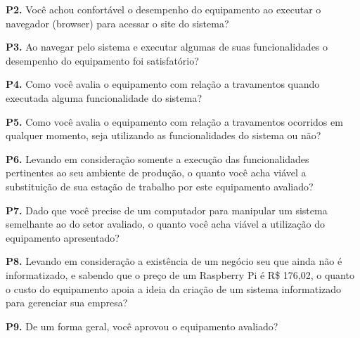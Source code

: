 \textbf{P2.} Você achou confortável o desempenho do equipamento ao executar o navegador (browser) para acessar o site do sistema?

\textbf{P3.} Ao navegar pelo sistema e executar algumas de suas funcionalidades o desempenho do equipamento foi satisfatório?

\textbf{P4.} Como você avalia o equipamento com relação a travamentos quando executada alguma funcionalidade do sistema?

\textbf{P5.} Como você avalia o equipamento com relação a travamentos ocorridos em qualquer momento, seja utilizando as funcionalidades do sistema ou não?

\textbf{P6.} Levando em consideração somente a execução das funcionalidades pertinentes ao seu ambiente de produção, o quanto você acha viável a substituição de sua estação de trabalho por este equipamento avaliado?

\textbf{P7.} Dado que você precise de um computador para manipular um sistema semelhante ao do setor avaliado, o quanto você acha viável a utilização do equipamento apresentado?

\textbf{P8.} Levando em consideração a existência de um negócio seu que ainda não é informatizado, e sabendo que o preço de um Raspberry Pi é  R\$ 176,02, o quanto o custo do equipamento apoia a ideia da criação de um sistema informatizado para gerenciar sua empresa?

\textbf{P9.} De um forma geral, você aprovou o equipamento avaliado?
